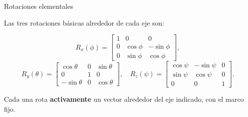 \documentclass[11pt]{beamer}
\newcommand{\srcShuster}{\href{https://ru.scribd.com/doc/155830038/A-Survey-of-Attitude-Representations}{Shuster (1993)}}
\newcommand{\srcMarkley}{\href{https://notes.jaydickson.net/assets/resources/Textbooks/Markley\%20and\%20Crassidis\%20-\%202014\%20-\%20Fundamentals\%20of\%20Spacecraft\%20Attitude\%20Determination\%20.pdf}{Markley \& Crassidis (2014)}{Markley \& Crassidis (2014)}}
\newcommand{\SourceLine}[1]{\vfill{\tiny\textcolor{gray}{Fuentes: #1}}}
\begin{document}
\begin{frame}{Rotaciones elementales}

Las tres rotaciones básicas alrededor de cada eje son:

\[
R_x(\phi) =
\begin{bmatrix}
1 & 0 & 0 \\
0 & \cos\phi & -\sin\phi \\
0 & \sin\phi &  \cos\phi
\end{bmatrix},
\]
\[
R_y(\theta) =
\begin{bmatrix}
 \cos\theta & 0 & \sin\theta \\
 0          & 1 & 0          \\
-\sin\theta & 0 & \cos\theta
\end{bmatrix},
\quad
R_z(\psi) =
\begin{bmatrix}
\cos\psi & -\sin\psi & 0 \\
\sin\psi &  \cos\psi & 0 \\
0        & 0         & 1
\end{bmatrix}.
\]

\medskip
Cada una rota \textbf{activamente} un vector alrededor del eje indicado, con el marco fijo.

\end{frame}


\end{document}
